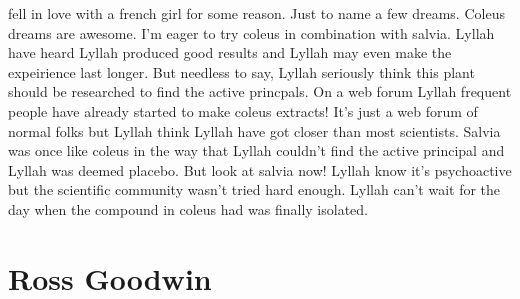 \documentclass[12pt]{book}
\begin{document}
fell in love with a french girl for some reason. Just to name a few dreams. Coleus dreams are awesome. I'm eager to try coleus in combination with salvia. Lyllah have heard Lyllah produced good results and Lyllah may even make the expeirience last longer. But needless to say, Lyllah seriously think this plant should be researched to find the active princpals. On a web forum Lyllah frequent people have already started to make coleus extracts! It's just a web forum of normal folks but Lyllah think Lyllah have got closer than most scientists. Salvia was once like coleus in the way that Lyllah couldn't find the active principal and Lyllah was deemed placebo. But look at salvia now! Lyllah know it's psychoactive but the scientific community wasn't tried hard enough. Lyllah can't wait for the day when the compound in coleus had was finally isolated.



\chapter{Ross Goodwin}
\end{document}
